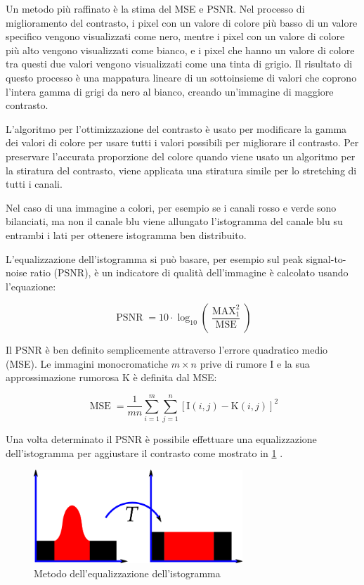 Un metodo più raffinato è la stima del MSE e PSNR. Nel processo di miglioramento del contrasto, i pixel con
un valore di colore più basso di un valore specifico vengono visualizzati come
nero, mentre i pixel con un valore di colore più alto vengono
visualizzati come bianco, e i pixel che hanno un valore di colore tra questi due valori vengono visualizzati come una tinta di grigio.
Il risultato di questo processo è una mappatura lineare di un
sottoinsieme di valori che coprono l'intera gamma di grigi da
nero al bianco, creando un'immagine di maggiore contrasto. 

L'algoritmo per l'ottimizzazione del contrasto è usato per modificare
la gamma dei valori di colore per usare tutti i valori possibili per
migliorare il contrasto. Per preservare l'accurata proporzione del colore
quando viene usato un algoritmo per la  stiratura del contrasto,
viene applicata una stiratura simile per lo stretching di tutti i canali. 

Nel caso di una immagine a colori, per esempio se i canali rosso e verde sono bilanciati, ma non il canale blu viene allungato l'istogramma del canale blu su entrambi i lati per ottenere
istogramma ben distribuito.

L'equalizzazione dell'istogramma si può basare, per esempio sul peak signal-to-noise ratio (PSNR), è un indicatore di qualità dell'immagine è calcolato usando l'equazione:

\[ \operatorname{PSNR}=10 \cdot \log _{10}\left(\frac{\operatorname{MAX}_{1}^{2}}{\operatorname{MSE}}\right) \]

Il PSNR è ben definito semplicemente attraverso l'errore quadratico medio (MSE).
Le immagini monocromatiche \(m\times n\) prive di rumore I e la sua approssimazione rumorosa K è definita dal MSE:

\[ \operatorname{MSE}=\frac{1}{m n} \sum_{i=1}^{m} \sum_{j=1}^{n}[\mathrm{I}(i, j)-\mathrm{K}(i, j)]^{2} \]

Una volta determinato il PSNR è possibile effettuare una equalizzazione dell'istogramma per aggiustare il contrasto come mostrato in \cref{fig:histogram} \cite{pandey_contrast} \cite{permual_contrast} \cite{hummel_histogram}.

\begin{figure}[ht]
    \centering
    \includegraphics[width=0.7\textwidth]{preprocessing/histogram.png}
    \caption{Metodo dell'equalizzazione dell'istogramma}
    \label{fig:histogram}
\end{figure}

